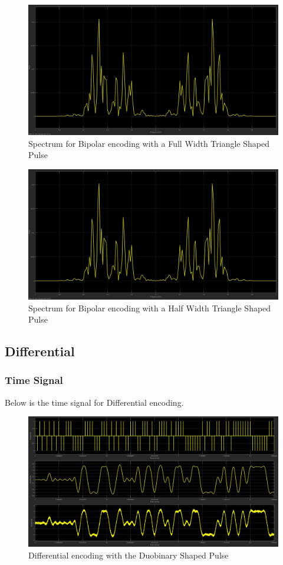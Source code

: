 \documentclass{article}
\begin{document}
\begin{figure}[H]
  \includegraphics[width = \linewidth]{BP_Tri_F_Spectrum.jpg}
  \caption{Spectrum for Bipolar encoding with a Full Width Triangle Shaped Pulse}
  \label{fig:BP-Tri-F-Spectrum}
\end{figure}
\begin{figure}[H]
  \includegraphics[width = \linewidth]{BP_Tri_H_Spectrum.jpg}
  \caption{Spectrum for Bipolar encoding with a Half Width Triangle Shaped Pulse}
  \label{fig:BP-Tri-H-Spectrum}
\end{figure}

\subsection{Differential}

\subsubsection{Time Signal}
Below is the time signal for Differential encoding.
\begin{figure}[H]
  \includegraphics[width = \linewidth]{DuoBinary.jpg}
  \caption{Differential encoding with the Duobinary Shaped Pulse}
  \label{fig:DuoBinary}
\end{figure}
\end{document}
